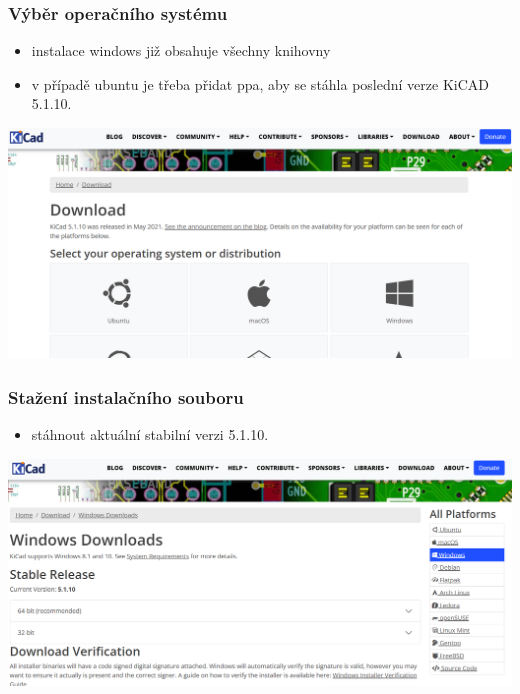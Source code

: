 \documentclass{beamer}
\newcommand{\kicadVersion}{5.1.10.}
\begin{document}
	\begin{frame}
    \frametitle{Výběr operačního systému}
		\small
		\begin{itemize}
			\item instalace windows již obsahuje všechny knihovny
			\item v případě ubuntu je třeba přidat ppa, aby se stáhla poslední verze KiCAD \kicadVersion\
		\end{itemize}
		
		\begin{center}
			\includegraphics[scale=0.3]{obr/kicad_dwnld.png}
		\end{center}
	\end{frame}
	\begin{frame}
    \frametitle{Stažení instalačního souboru}
		\small
		\begin{itemize}
			\item stáhnout aktuální stabilní verzi \kicadVersion\
		\end{itemize}
		
		\begin{center}
			\includegraphics[scale=0.3]{obr/kicad_stbv.png}
		\end{center}
	\end{frame}
\end{document}
